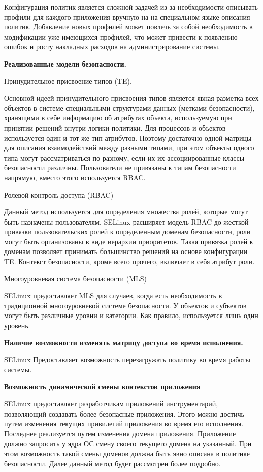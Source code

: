 Конфигурация политик является 
сложной задачей из-за необходимости
описывать профили для каждого приложения 
вручную на на специальном языке описания
политик. Добавление новых профилей может повлечь 
за собой необходимость в модификации уже имеющихся 
профилей, что может привести к появлению 
ошибок и росту накладных расходов на 
администрирование системы.  

\bigskip
{\bfseries Реализованные модели безопасности. }

Принудительное присвоение типов (TE). 

Основной идеей принудительного присвоения
типов является явная разметка всех объектов 
в системе специальными структурами данных 
(метками безопасности), хранящими в себе информацию
об атрибутах объекта, используемую при принятии 
решений внутри логики политики. 
Для процессов и объектов используется 
один и тот же тип атрибутов. Поэтому достаточно 
одной матрицы для описания взаимодействий между 
разными типами, при этом объекты одного типа могут 
рассматриваться по-разному, если их их ассоциированные 
классы безопасности различны. Пользователи не 
привязаны к типам безопасности напрямую, вместо 
этого используется RBAC.

\bigskip
Ролевой контроль доступа (RBAC) 

Данный метод используется для определения 
множества ролей, которые могут 
быть назначены пользователям. SELinux расширяет 
модель RBAC до жесткой привязки пользовательских 
ролей к определенным доменам безопасности, роли 
могут быть организованы в виде иерархии приоритетов. 
Такая привязка ролей к доменам позволяет принимать 
большинство решений на основе конфигурации TE. 
Контекст безопасности, кроме всего прочего, включает 
в себя атрибут роли.

\bigskip
Многоуровневая система безопасности (MLS) 

SELinux предоставляет MLS для случаев, когда есть 
необходимость в традиционной многоуровневой системе 
безопасности. У объектов и субъектов могут быть 
различные уровни и категории. 
Как правило, используется лишь один уровень. 

\bigskip 
{\bfseries Наличие возможности изменять матрицу доступа 
	во время исполнения.} 

SELinux Предоставляет возможность перезагружать 
	политику во время работы системы. 

\bigskip
{\bfseries Возможность динамической смены контекстов 
приложения} 
 
SELinux предоставляет разработчикам приложений 
инструментарий, позволяющий создавать более 
безопасные приложения. Этого можно достичь 
путем изменения текущих привилегий приложения 
во время его исполнения. 
Последнее реализуется путем изменения домена приложения. 
Приложение должно запросить у ядра ОС смену своего 
текущего домена на указанный. При этом возможность
такой смены доменов должна быть явно описана в 
политике безопасности. Далее данный метод будет
рассмотрен более подробно.  

